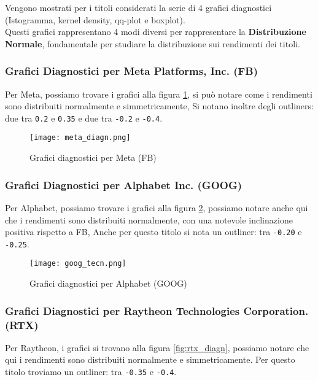 Vengono mostrati per i titoli considerati la serie di 4 grafici diagnostici (Istogramma, kernel density, qq-plot e boxplot).\\
Questi grafici rappresentano 4 modi diversi per rappresentare la \textbf{Distribuzione Normale}, fondamentale per studiare la distribuzione sui rendimenti dei titoli.

\subsubsection{Grafici Diagnostici per Meta Platforms, Inc. (FB)}

Per Meta, possiamo trovare i grafici alla figura \ref{fig:meta_diagn}, si può notare come i rendimenti sono distribuiti normalmente e simmetricamente,
Si notano inoltre degli outliners: due tra \verb|0.2| e \verb|0.35| e due tra \verb|-0.2| e \verb|-0.4|.

\begin{figure}[h]
  \centering
  \texttt{[image: meta\_diagn.png]}
  \caption{Grafici diagnostici per Meta (FB)}
  \label{fig:meta_diagn}
\end{figure}

\pagebreak

\subsubsection{Grafici Diagnostici per Alphabet Inc. (GOOG)}

Per Alphabet, possiamo trovare i grafici alla figura \ref{fig:goog_diagn}, possiamo notare anche qui che i rendimenti sono distribuiti normalmente, con una notevole inclinazione positiva rispetto a FB,
Anche per questo titolo si nota un outliner: tra \verb|-0.20| e \verb|-0.25|.

\vspace{3cm}

\begin{figure}[h]
  \centering
  \texttt{[image: goog\_tecn.png]}
  \caption{Grafici diagnostici per Alphabet (GOOG)}
  \label{fig:goog_diagn}
\end{figure}

\pagebreak

\subsubsection{Grafici Diagnostici per Raytheon Technologies Corporation. (RTX)}

Per Raytheon, i grafici si trovano alla figura \ref{fig:rtx_diagn}, possiamo notare che qui i rendimenti sono distribuiti normalmente e simmetricamente.
Per questo titolo troviamo un outliner: tra \verb|-0.35| e \verb|-0.4|.

